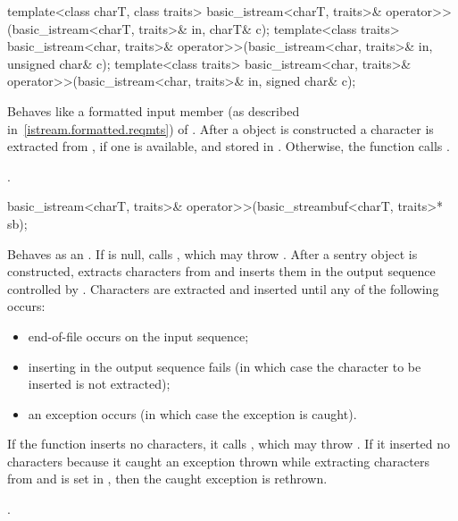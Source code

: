 %
\begin{itemdecl}
template<class charT, class traits>
  basic_istream<charT, traits>& operator>>(basic_istream<charT, traits>& in, charT& c);
template<class traits>
  basic_istream<char, traits>& operator>>(basic_istream<char, traits>& in, unsigned char& c);
template<class traits>
  basic_istream<char, traits>& operator>>(basic_istream<char, traits>& in, signed char& c);
\end{itemdecl}

\begin{itemdescr}
\pnum
\effects
Behaves like a formatted input member (as described in~\ref{istream.formatted.reqmts})
of .
After a
object is constructed
a character is extracted from , if one is available, and stored in .
Otherwise, the function calls
.

\pnum
\returns
{}.
\end{itemdescr}

%
\begin{itemdecl}
basic_istream<charT, traits>& operator>>(basic_streambuf<charT, traits>* sb);
\end{itemdecl}

\begin{itemdescr}
\pnum
\effects
Behaves as an .
If  is null, calls
,
which may throw
.
After a sentry object is constructed, extracts
characters from
and inserts them in the output sequence controlled by .
Characters are extracted and inserted until any of the following occurs:
\begin{itemize}
\item
end-of-file occurs on the input sequence;
\item
inserting in the output sequence fails
(in which case the character to be inserted is not extracted);
\item
an exception occurs (in which case the exception is caught).
\end{itemize}

\pnum
If the function inserts no characters, it calls
,
which may throw
.
If it inserted no characters because it caught
an exception thrown while extracting characters from
and
is set in
,
then the caught exception is rethrown.

\pnum
\returns
{}.
\end{itemdescr}

